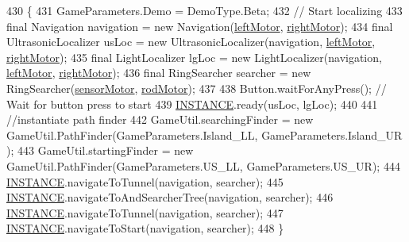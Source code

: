\begin{DoxyCode}
430                                                   \{
431     GameParameters.Demo = DemoType.Beta;
432     \textcolor{comment}{// Start localizing}
433     \textcolor{keyword}{final} Navigation navigation = \textcolor{keyword}{new} Navigation(\hyperlink{enumca_1_1mcgill_1_1ecse211_1_1project_1_1_game_a7c673571bf50fdb6917a9d7bb671e003}{leftMotor}, \hyperlink{enumca_1_1mcgill_1_1ecse211_1_1project_1_1_game_a7a05fcf37c4435c32270776a427ba0d2}{rightMotor});
434     \textcolor{keyword}{final} UltrasonicLocalizer usLoc = \textcolor{keyword}{new} UltrasonicLocalizer(navigation, 
      \hyperlink{enumca_1_1mcgill_1_1ecse211_1_1project_1_1_game_a7c673571bf50fdb6917a9d7bb671e003}{leftMotor}, \hyperlink{enumca_1_1mcgill_1_1ecse211_1_1project_1_1_game_a7a05fcf37c4435c32270776a427ba0d2}{rightMotor});
435     \textcolor{keyword}{final} LightLocalizer lgLoc = \textcolor{keyword}{new} LightLocalizer(navigation, \hyperlink{enumca_1_1mcgill_1_1ecse211_1_1project_1_1_game_a7c673571bf50fdb6917a9d7bb671e003}{leftMotor}, 
      \hyperlink{enumca_1_1mcgill_1_1ecse211_1_1project_1_1_game_a7a05fcf37c4435c32270776a427ba0d2}{rightMotor});
436     \textcolor{keyword}{final} RingSearcher searcher = \textcolor{keyword}{new} RingSearcher(\hyperlink{enumca_1_1mcgill_1_1ecse211_1_1project_1_1_game_aa94b85dc88de85d959677bd6c0f98989}{sensorMotor}, 
      \hyperlink{enumca_1_1mcgill_1_1ecse211_1_1project_1_1_game_abc070af2fa5a5cda6d81977b35aacfb4}{rodMotor});
437     
438     Button.waitForAnyPress(); \textcolor{comment}{// Wait for button press to start}
439       \hyperlink{enumca_1_1mcgill_1_1ecse211_1_1project_1_1_game_a6584b6534b14ba43dc1444084a925a20}{INSTANCE}.ready(usLoc, lgLoc);
440       
441       \textcolor{comment}{//instantiate path finder}
442       GameUtil.searchingFinder = \textcolor{keyword}{new} GameUtil.PathFinder(GameParameters.Island\_LL, GameParameters.Island\_UR
      );
443       GameUtil.startingFinder = \textcolor{keyword}{new} GameUtil.PathFinder(GameParameters.US\_LL, GameParameters.US\_UR);
444       \hyperlink{enumca_1_1mcgill_1_1ecse211_1_1project_1_1_game_a6584b6534b14ba43dc1444084a925a20}{INSTANCE}.navigateToTunnel(navigation, searcher);
445       \hyperlink{enumca_1_1mcgill_1_1ecse211_1_1project_1_1_game_a6584b6534b14ba43dc1444084a925a20}{INSTANCE}.navigateToAndSearcherTree(navigation, searcher);
446       \hyperlink{enumca_1_1mcgill_1_1ecse211_1_1project_1_1_game_a6584b6534b14ba43dc1444084a925a20}{INSTANCE}.navigateToTunnel(navigation, searcher);
447       \hyperlink{enumca_1_1mcgill_1_1ecse211_1_1project_1_1_game_a6584b6534b14ba43dc1444084a925a20}{INSTANCE}.navigateToStart(navigation, searcher);
448   \}
\end{DoxyCode}


